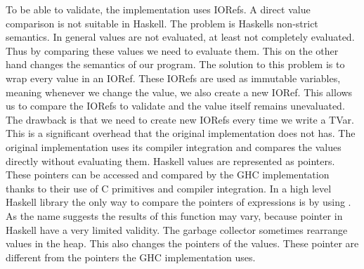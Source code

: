 To be able to validate, the implementation uses IORefs. A direct value comparison is not suitable in Haskell.
The problem is Haskells non-strict semantics. In general values are not evaluated, at least not completely evaluated. 
Thus by comparing these values we need to evaluate them. This on the other hand changes the semantics of our program.
The solution to this problem is to wrap every value in an IORef. These IORefs are used as immutable variables, meaning
whenever we change the value, we also create a new IORef. This allows us to compare the IORefs to validate and the 
value itself remains unevaluated. The drawback is that we need to create new IORefs every time we write a TVar. 
This is a significant overhead that the original implementation does not has. The original implementation uses its 
compiler integration and compares the values directly without evaluating them. Haskell values are represented as 
pointers. These pointers can be accessed and compared by the GHC implementation thanks to their use of C primitives 
and compiler integration. In a high level Haskell library the only way to compare the pointers of expressions is by using
. As the name suggests the results of this function may vary, because pointer in Haskell
have a very limited validity. The garbage collector sometimes rearrange values in the heap. This also changes the 
pointers of the values. These pointer are different from the pointers the GHC implementation uses.

